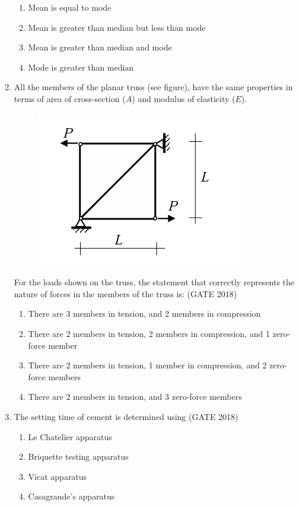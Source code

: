 \documentclass[journal,12pt,onecolumn]{IEEEtran}
\theoremstyle{remark}
\begin{document}
\begin{enumerate}
\begin{enumerate}
    \item Mean is equal to mode
    \item Mean is greater than median but less than mode
    \item Mean is greater than median and mode
    \item Mode is greater than median
\end{enumerate}

\vspace{1cm}

\item All the members of the planar truss (see figure), have the same properties in terms of area of cross-section ($A$) and modulus of elasticity ($E$).
\begin{figure}[h]
    \centering
    \includegraphics[width=0.5\linewidth]{GATE-CE-2018/4-2.png}
    \caption{}
    \label{4-2}
\end{figure}
For the loads shown on the truss, the statement that correctly represents the nature of forces in the members of the truss is:
\hfill{(GATE 2018)}

\begin{enumerate}
    \item There are 3 members in tension, and 2 members in compression
    \item There are 2 members in tension, 2 members in compression, and 1 zero-force member
    \item There are 2 members in tension, 1 member in compression, and 2 zero-force members
    \item There are 2 members in tension, and 3 zero-force members
\end{enumerate}

\vspace{1cm}

\item The setting time of cement is determined using
\hfill{(GATE 2018)}

\begin{enumerate}
    \item Le Chatelier apparatus
    \item Briquette testing apparatus
    \item Vicat apparatus
    \item Casagrande's apparatus
\end{enumerate}


\end{enumerate}
\end{document}

